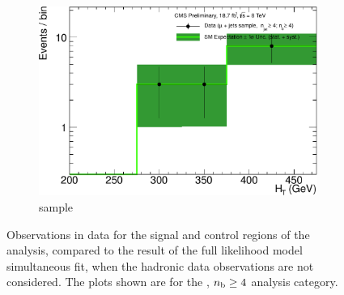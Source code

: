 \begin{figure}[h!]
\begin{subfigure}[b]{0.48\textwidth}
    \includegraphics[width=\textwidth]
    {Figs/results/v0/greenBand/single_plots/muon_ge4b_ge4j_logy.pdf}
    \caption{\mj sample}
  \end{subfigure}
  \caption{Observations in data for the signal and control
  regions of the analysis, compared to the result of the full likelihood model
  simultaneous fit, when the hadronic data observations are not considered. The
  plots shown are for the \njhigh, $n_{\text{b}} \geq 4$ analysis category.}
  \label{fig:green_fits_ge4b_ge4j}
\end{figure}



